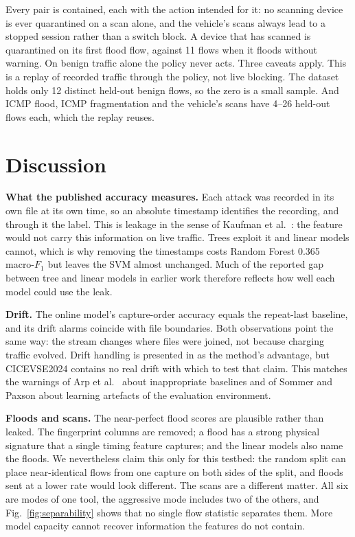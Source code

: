 \documentclass[conference]{IEEEtran}
\begin{document}
Every pair is contained, each with the action intended for it: no scanning device is ever quarantined on a scan alone, and the vehicle's scans always lead to a stopped session rather than a switch block. A device that has scanned is quarantined on its first flood flow, against 11 flows when it floods without warning. On benign traffic alone the policy never acts. Three caveats apply. This is a replay of recorded traffic through the policy, not live blocking. The dataset holds only 12 distinct held-out benign flows, so the zero is a small sample. And ICMP flood, ICMP fragmentation and the vehicle's scans have 4--26 held-out flows each, which the replay reuses.

\section{Discussion}
\label{sec:discussion}

\textbf{What the published accuracy measures.} Each attack was recorded in its own file at its own time, so an absolute timestamp identifies the recording, and through it the label. This is leakage in the sense of Kaufman et al.\ \cite{b10}: the feature would not carry this information on live traffic. Trees exploit it and linear models cannot, which is why removing the timestamps costs Random Forest 0.365 macro-$F_1$ but leaves the SVM almost unchanged. Much of the reported gap between tree and linear models in earlier work therefore reflects how well each model could use the leak.

\textbf{Drift.} The online model's capture-order accuracy equals the repeat-last baseline, and its drift alarms coincide with file boundaries. Both observations point the same way: the stream changes where files were joined, not because charging traffic evolved. Drift handling is presented in \cite{b4} as the method's advantage, but CICEVSE2024 contains no real drift with which to test that claim. This matches the warnings of Arp et al.\ \cite{b11} about inappropriate baselines and of Sommer and Paxson \cite{b13} about learning artefacts of the evaluation environment.

\textbf{Floods and scans.} The near-perfect flood scores are plausible rather than leaked. The fingerprint columns are removed; a flood has a strong physical signature that a single timing feature captures; and the linear models also name the floods. We nevertheless claim this only for this testbed: the random split can place near-identical flows from one capture on both sides of the split, and floods sent at a lower rate would look different. The scans are a different matter. All six are modes of one tool, the aggressive mode includes two of the others, and Fig.~\ref{fig:separability} shows that no single flow statistic separates them. More model capacity cannot recover information the features do not contain.
\end{document}

